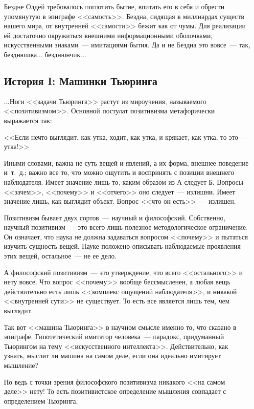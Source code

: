 \documentclass{scrbook}
\newcommand{\flqq}{<<}
\newcommand{\frqq}{>>}
\newcommand{\mdash}{~--- }
\newcommand{\essaysection}[1]{\subsection*{#1}\nopagebreak}
\begin{document}
Бездне Олдей требовалось поглотить бытие, впитать его в себя и обрести упомянутую в эпиграфе {\flqq}самость{\frqq}. Бездна, сидящая в миллиардах существ нашего мира, от внутренней {\flqq}самости{\frqq} бежит как от чумы. Для реализации ей достаточно окружиться внешними информационными оболочками, искусственными знаками{\mdash}имитациями бытия. Да и не Бездна это вовсе{\mdash}так, безднюшка... безднюнчик...

\essaysection{История I: Машинки Тьюринга}

...Ноги {\flqq}задачи Тьюринга{\frqq} растут из мироучения, называемого {\flqq}позитивизмом{\frqq}. Основной постулат позитивизма метафорически выражается так:

{\flqq}Если нечто выглядит, как утка, ходит, как утка, и крякает, как утка, то это{\mdash}утка!{\frqq}

Иными словами, важна не суть вещей и явлений, а их форма, внешнее поведение и~т.~д.; важно все то, что можно ощутить и воспринять с позиции внешнего наблюдателя. Имеет значение лишь то, каким образом из А следует Б. Вопросы {\flqq}зачем{\frqq}, {\flqq}почему{\frqq} и {\flqq}отчего{\frqq} оно следует{\mdash}излишни. Имеет значение лишь, как выглядит объект. Вопрос {\flqq}что он есть{\frqq}{\mdash}излишен.

Позитивизм бывает двух сортов{\mdash}научный и философский. Собственно, научный позитивизм{\mdash}это всего лишь полезное методологическое ограничение. Он означает, что наука не должна задаваться вопросом {\flqq}почему{\frqq} и пытаться изучить сущность вещей. Науке положено описывать наблюдаемые проявления этих вещей, остальное{\mdash}не ее дело.

А философский позитивизм{\mdash}это утверждение, что всего {\flqq}остального{\frqq} и нету вовсе. Что вопрос {\flqq}почему{\frqq} вообще бессмысленен, а любая вещь действительно есть лишь {\flqq}комплекс ощущений наблюдателя{\frqq}, и никакой {\flqq}внутренней сути{\frqq} не существует. То есть все является лишь тем, чем выглядит.

Так вот {\flqq}машина Тьюринга{\frqq} в научном смысле именно то, что сказано в эпиграфе. Гипотетический имитатор человека{\mdash}парадокс, придуманный Тьюрингом на тему {\flqq}искусственного интеллекта{\frqq}. Действительно, как узнать, мыслит ли машина на самом деле, если она идеально имитирует мышление?

Но ведь с точки зрения философского позитивизма никакого {\flqq}на самом деле{\frqq} нету! То есть позитивистское определение мышления совпадает с определением Тьюринга.
\end{document}
